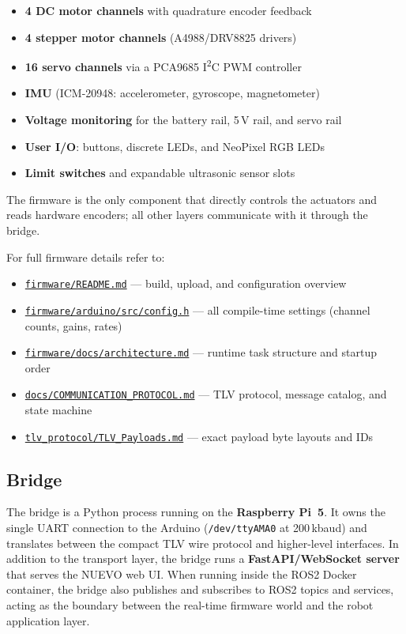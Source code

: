 \documentclass{ol-softwaremanual}
\newcommand{\doclink}[2]{\href{#1}{#2}}
\begin{document}
\begin{itemize}
  \item \textbf{4 DC motor channels} with quadrature encoder feedback
  \item \textbf{4 stepper motor channels} (A4988/DRV8825 drivers)
  \item \textbf{16 servo channels} via a PCA9685 I\textsuperscript{2}C PWM controller
  \item \textbf{IMU} (ICM-20948: accelerometer, gyroscope, magnetometer)
  \item \textbf{Voltage monitoring} for the battery rail, 5\,V rail, and servo rail
  \item \textbf{User I/O}: buttons, discrete LEDs, and NeoPixel RGB LEDs
  \item \textbf{Limit switches} and expandable ultrasonic sensor slots
\end{itemize}

The firmware is the only component that directly controls the actuators and reads
hardware encoders; all other layers communicate with it through the bridge.

For full firmware details refer to:
\begin{itemize}
  \item \doclink{https://github.com/pochihh/Project-NUEVO/blob/main/firmware/README.md}{\texttt{firmware/README.md}} --- build, upload, and configuration overview
  \item \doclink{https://github.com/pochihh/Project-NUEVO/blob/main/firmware/arduino/src/config.h}{\texttt{firmware/arduino/src/config.h}} --- all compile-time settings (channel counts, gains, rates)
  \item \doclink{https://github.com/pochihh/Project-NUEVO/blob/main/firmware/docs/architecture.md}{\texttt{firmware/docs/architecture.md}} --- runtime task structure and startup order
  \item \doclink{https://github.com/pochihh/Project-NUEVO/blob/main/docs/COMMUNICATION_PROTOCOL.md}{\texttt{docs/COMMUNICATION\_PROTOCOL.md}} --- TLV protocol, message catalog, and state machine
  \item \doclink{https://github.com/pochihh/Project-NUEVO/blob/main/tlv_protocol/TLV_Payloads.md}{\texttt{tlv\_protocol/TLV\_Payloads.md}} --- exact payload byte layouts and IDs
\end{itemize}

\subsection*{Bridge}
The bridge is a Python process running on the \textbf{Raspberry Pi~5}.
It owns the single UART connection to the Arduino (\texttt{/dev/ttyAMA0} at 200\,kbaud)
and translates between the compact TLV wire protocol and higher-level interfaces.
In addition to the transport layer, the bridge runs a \textbf{FastAPI/WebSocket server}
that serves the NUEVO web UI.
When running inside the ROS2 Docker container, the bridge also publishes and subscribes
to ROS2 topics and services, acting as the boundary between the real-time firmware world
and the robot application layer.
\end{document}
